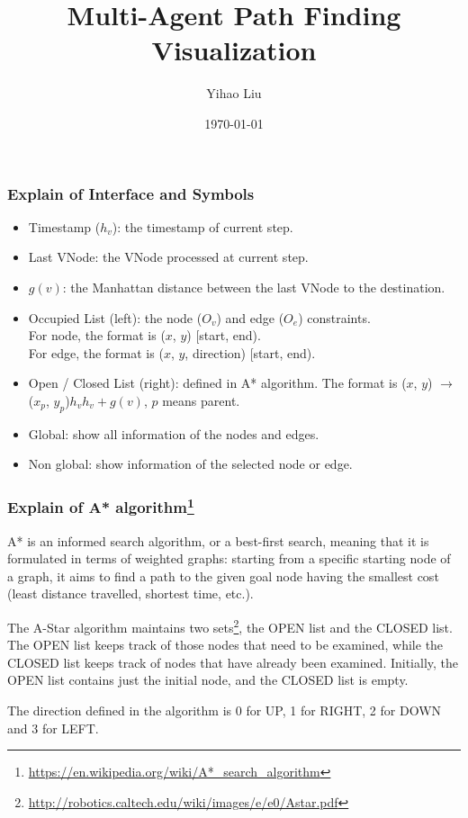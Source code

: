 \documentclass{beamer}
\date{\today}
\title{Multi-Agent Path Finding Visualization}
\author{Yihao Liu}
\begin{document}
\begin{frame}
  \titlepage
\end{frame}

\begin{frame}
\frametitle{Explain of Interface and Symbols}
\begin{itemize}
\item Timestamp ($h_v$): the timestamp of current step.
\item Last VNode: the VNode processed at current step.
\item $g(v)$: the Manhattan distance between the last VNode to the destination.
\item Occupied List (left): the node ($O_v$) and edge ($O_e$) constraints. \\
For node, the format is ($x$, $y$) [start, end). \\
For edge, the format is ($x$, $y$, direction) [start, end).
\item Open / Closed List (right): defined in A* algorithm. The format is ($x$, $y$) $\rightarrow$ ($x_p$, $y_p$)\quad $h_v$\quad $h_v+g(v)$, $p$ means parent.
\item Global: show all information of the nodes and edges.
\item Non global: show information of the selected node or edge.
\end{itemize}
\end{frame}

\begin{frame}
\frametitle{Explain of A* algorithm\footnote[1]{\url{https://en.wikipedia.org/wiki/A*_search_algorithm}}}

A* is an informed search algorithm, or a best-first search, meaning that it is formulated in terms of weighted graphs: starting from a specific starting node of a graph, it aims to find a path to the given goal node having the smallest cost (least distance travelled, shortest time, etc.). \medskip

The A-Star algorithm maintains two sets\footnote[2]{\url{http://robotics.caltech.edu/wiki/images/e/e0/Astar.pdf}}, the OPEN list and the CLOSED list. The OPEN list keeps track of
those nodes that need to be examined, while the CLOSED list keeps track of nodes that have already been
examined. Initially, the OPEN list contains just the initial node, and the CLOSED list is empty. \medskip

The direction defined in the algorithm is 0 for UP, 1 for RIGHT, 2 for DOWN and 3 for LEFT.

\end{frame}
\end{document}
